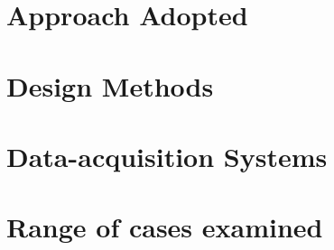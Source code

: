 \section{Approach Adopted}
\section{Design Methods}
\section{Data-acquisition Systems}
\section{Range of cases examined}